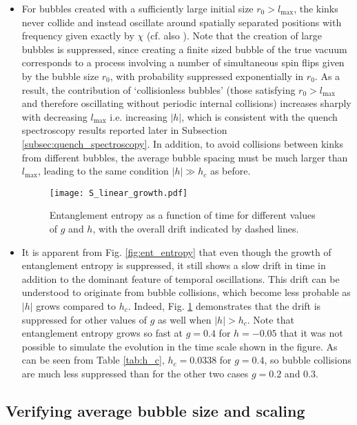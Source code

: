 \documentclass[amsmath,amssymb,11pt]{article}
\numberwithin{equation}{section}
\numberwithin{figure}{section}
\numberwithin{table}{section}
\begin{document}
\begin{itemize}
\item {For bubbles created with a sufficiently large initial size $r_0>l_\mathrm{max}$, the kinks never collide and instead oscillate around spatially separated positions with frequency given exactly by $\chi$ (cf. also \cite{2008JSP...131..917R}). Note that the creation of large bubbles is suppressed, since creating a finite sized bubble of the true vacuum corresponds to a process involving a number of simultaneous spin flips given by the bubble size $r_0$, with probability suppressed exponentially in $r_0$. As a result, the contribution of `collisionless bubbles' (those satisfying $r_0>l_\mathrm{max}$ and therefore oscillating without periodic internal collisions) increases sharply with decreasing $l_\mathrm{max}$ i.e. increasing $|h|$, which is consistent with the quench spectroscopy results reported later in Subsection \ref{subsec:quench_spectroscopy}. In addition, to avoid collisions between kinks from different bubbles, the average bubble spacing must be much larger than $l_\mathrm{max}$, leading to the same condition $|h|\gg h_c$ as before.}

\begin{figure}
\centering
\texttt{[image: S\_linear\_growth.pdf]}
\caption{\label{fig:S_linear_growth} {Entanglement entropy as a function of time for different values of $g$ and $h$, with the overall drift indicated by dashed lines.}
}
\end{figure}

\item {It is apparent from Fig. \ref{fig:ent_entropy} that even though the growth of entanglement entropy is suppressed, it still shows a slow drift in time in addition to the dominant feature of temporal oscillations. This drift can be understood to originate from bubble collisions, which become less probable as $|h|$ grows compared to $h_c$. Indeed, Fig. \ref{fig:S_linear_growth} demonstrates that the drift is suppressed for other values of $g$ as well when $|h| > h_c$. Note that entanglement entropy grows so fast at $g=0.4$ for $h=-0.05$ that it was not possible to simulate the evolution in the time scale shown in the figure. As can be seen from Table \ref{tab:h_c}, $h_c=0.0338$ for $g=0.4$, so bubble collisions are much less suppressed than for the other two cases $g=0.2$ and $0.3$. }

\end{itemize}

\subsection{Verifying average bubble size and scaling} 
\end{document}
